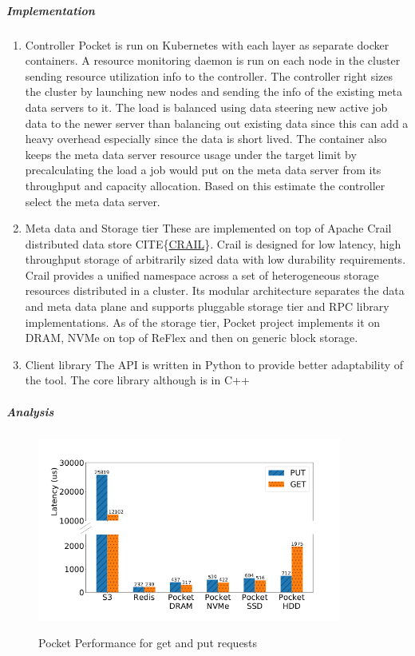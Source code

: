 \documentclass[12pt,titlepage]{article}
\begin{document}
\subparagraph{Implementation}
\label{sec:org299a66b}
\begin{enumerate}
\item Controller
\label{sec:org4b6ab23}
Pocket is run on Kubernetes with each layer as separate docker containers. A
resource monitoring daemon is run on each node in the cluster sending resource
utilization info to the controller. The controller right sizes the cluster by
launching new nodes and sending the info of the existing meta data servers to
it. The load is balanced using data steering new active job data to the newer
server than balancing out existing data since this can add a heavy overhead
especially since the data is short lived. The container also keeps the meta data
server resource usage under the target limit by precalculating the load a job
would  put on the meta data server from its throughput and capacity allocation.
Based on this estimate the controller select the meta data server.
\item Meta data and Storage tier
\label{sec:orgb6fe09a}
These are implemented on top of Apache Crail distributed data store CITE\{\href{https://crail.apache.org/}{CRAIL}\}.
Crail is designed for low latency, high throughput storage of arbitrarily sized
data with low durability requirements. Crail provides a unified namespace across
a set of heterogeneous storage resources distributed in a cluster. Its modular
architecture separates the data and meta data plane and supports pluggable
storage tier and RPC library implementations. As of the storage tier, Pocket
project implements it on DRAM, NVMe on top of ReFlex and then on generic block
storage.
\item Client library
\label{sec:org2f90dde}
The API is written in Python to provide better adaptability of the tool. The
core library although is in C++
\end{enumerate}

\subparagraph{Analysis}
\label{sec:org2defbc5}
\begin{figure}[!h]
    \caption{Pocket Performance for get and put requests}
    \centering
    \includegraphics[width=100mm]{./thesis_images/pocket_perf.png}
    \label{fig:pocket perf}
\end{figure}
\end{document}
